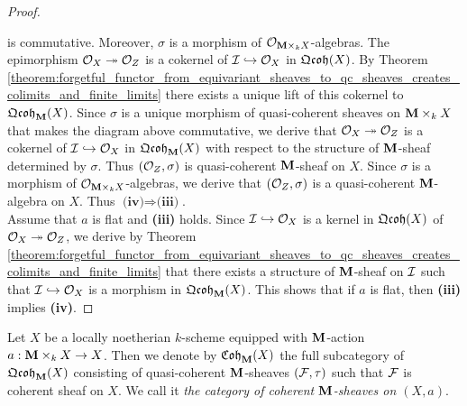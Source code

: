 \begin{proof}
\begin{center}
\end{center}
is commutative. Moreover, $\sigma$ is a morphism of ${\mathcal O}_{\mathbf{M}\times_k X}$-algebras. The epimorphism ${\mathcal O}_X\twoheadrightarrow {\mathcal O}_Z$ is a cokernel of ${\mathcal I}\hookrightarrow {\mathcal O}_X$ in $\mathfrak{Qcoh}(X)$. By Theorem \ref{theorem:forgetful_functor_from_equivariant_sheaves_to_qc_sheaves_creates_colimits_and_finite_limits} there exists a unique lift of this cokernel to $\mathfrak{Qcoh}_{\mathbf{M}}(X)$. Since $\sigma$ is a unique morphism of quasi-coherent sheaves on $\mathbf{M}\times_k X$ that makes the diagram above commutative, we derive that ${\mathcal O}_X\twoheadrightarrow {\mathcal O}_Z$ is a cokernel of ${\mathcal I}\hookrightarrow {\mathcal O}_X$ in $\mathfrak{Qcoh}_{\mathbf{M}}(X)$ with respect to the structure of $\mathbf{M}$-sheaf determined by $\sigma$. Thus $({\mathcal O}_Z,\sigma)$ is quasi-coherent $\mathbf{M}$-sheaf on $X$. Since $\sigma$ is a morphism of ${\mathcal O}_{\mathbf{M}\times_k X}$-algebras, we derive that $({\mathcal O}_Z,\sigma)$ is a quasi-coherent $\mathbf{M}$-algebra on $X$. Thus $\textbf{(iv)}\Rightarrow \textbf{(iii)}$.\\
Assume that $a$ is flat and \textbf{(iii)} holds. Since ${\mathcal I}\hookrightarrow {\mathcal O}_X$ is a kernel in $\mathfrak{Qcoh}(X)$ of ${\mathcal O}_X\twoheadrightarrow {\mathcal O}_Z$, we derive by Theorem \ref{theorem:forgetful_functor_from_equivariant_sheaves_to_qc_sheaves_creates_colimits_and_finite_limits} that there exists a structure of $\mathbf{M}$-sheaf on ${\mathcal I}$ such that ${\mathcal I}\hookrightarrow {\mathcal O}_X$ is a morphism in $\mathfrak{Qcoh}_{\mathbf{M}}(X)$. This shows that if $a$ is flat, then \textbf{(iii)} implies \textbf{(iv)}.
\end{proof}

\begin{definition}
Let $X$ be a locally noetherian $k$-scheme equipped with $\mathbf{M}$-action $a:\mathbf{M}\times_kX\rightarrow X$. Then we denote by $\mathfrak{Coh}_{\mathbf{M}}(X)$ the full subcategory of $\mathfrak{Qcoh}_{\mathbf{M}}(X)$ consisting of quasi-coherent $\mathbf{M}$-sheaves $({\mathcal F},\tau)$ such that ${\mathcal F}$ is coherent sheaf on $X$. We call it \textit{the category of coherent $\mathbf{M}$-sheaves on $(X,a)$}.
\end{definition}

